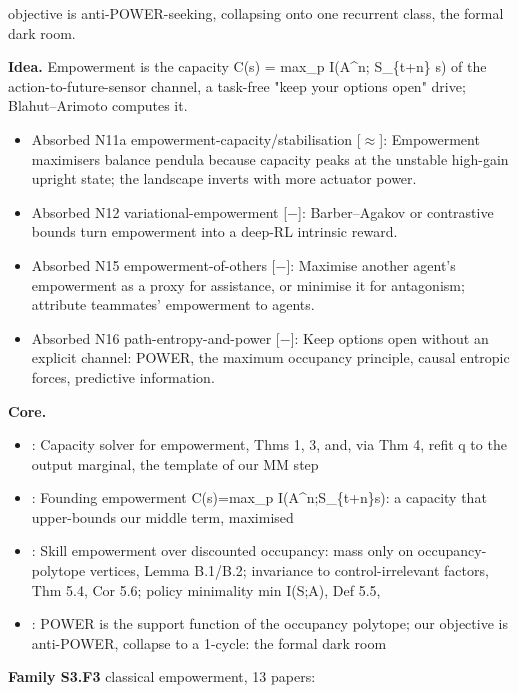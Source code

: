 \documentclass[10pt]{article}
\newcommand{\memb}[1]{\par\smallskip\textbf{#1}\quad}
\begin{document}
objective is anti-POWER-seeking, collapsing onto one recurrent class, the formal dark room.

\textbf{Idea.} Empowerment is the capacity C(s) = max\_p I(A\^{}n; S\_\{t+n\} \textbar{} s) of the action-to-future-sensor channel, a task-free "keep your options open" drive; Blahut--Arimoto computes it.
\begin{itemize}[nosep,leftmargin=1.2em]
\item Absorbed N11a empowerment-capacity/stabilisation [\ensuremath{\approx}]: Empowerment maximisers balance pendula because capacity peaks at the unstable high-gain upright state; the landscape inverts with more actuator power.
\item Absorbed N12 variational-empowerment [\ensuremath{-}]: Barber--Agakov or contrastive bounds turn empowerment into a deep-RL intrinsic reward.
\item Absorbed N15 empowerment-of-others [\ensuremath{-}]: Maximise another agent's empowerment as a proxy for assistance, or minimise it for antagonism; attribute teammates' empowerment to agents.
\item Absorbed N16 path-entropy-and-power [\ensuremath{-}]: Keep options open without an explicit channel: POWER, the maximum occupancy principle, causal entropic forces, predictive information.
\end{itemize}


\memb{Core.}
\begin{itemize}[nosep,leftmargin=1.2em]
\item \citet{Blahut-computation72}: Capacity solver for empowerment, Thms 1, 3, and, via Thm 4, refit q to the output marginal, the template of our MM step
\item \citet{Klyubin-empowerment05}: Founding empowerment C(s)=max\_p I(A\^{}n;S\_\{t+n\}\textbar{}s): a capacity that upper-bounds our middle term, maximised
\item \citet{Bastankhah-learning26}: Skill empowerment over discounted occupancy: mass only on occupancy-polytope vertices, Lemma B.1/B.2; invariance to control-irrelevant factors, Thm 5.4, Cor 5.6; policy minimality min I(S;A), Def 5.5,
\item \citet{Turner-optimal19}: POWER is the support function of the occupancy polytope; our objective is anti-POWER, collapse to a 1-cycle: the formal dark room
\end{itemize}
\memb{Family S3.F3} classical empowerment, 13 papers: {\footnotesize \citetext{\citealp{Blahut-computation72}; \citealp{Klyubin-empowerment05}; \citealp{Klyubin-all05}; \citealp{Anthony-impoverished09}; \citealp{Jung-empowerment11}; \citealp{Salge-approximation13}; \citealp{Salge-empowerment14}; \citealp{Grasso-empowered22}; \citealp{Tiomkin-process25}; \citealp{Arimoto-algorithm72}; \citealp{Capdepuy-maximization07}; \citealp{Anthony-preferred08}; \citealp{Salge-changing14}}}
\end{document}

